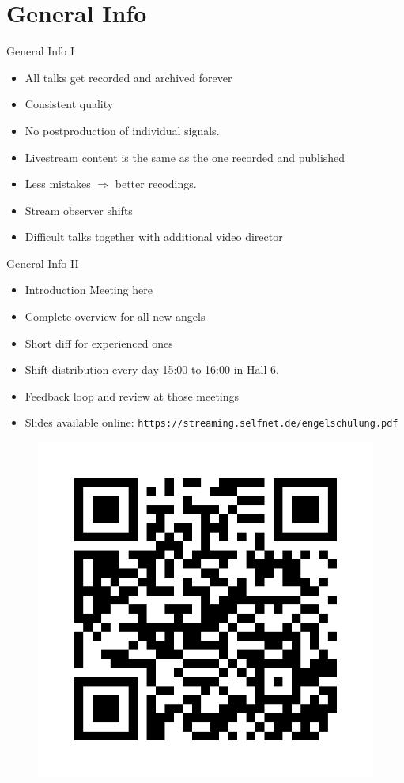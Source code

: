 \documentclass[aspectratio=169]{beamer}
\begin{document}
\section{General Info}
\begin{frame}{General Info I}
	\begin{itemize}
		\item All talks get recorded and archived forever
		\item Consistent quality
		\item No postproduction of individual signals.
		\item Livestream content is the same as the one recorded and published
		\item Less mistakes $\Rightarrow$ better recodings.
		\item Stream observer shifts
		\item Difficult talks together with additional video director
	\end{itemize}
\end{frame}


\begin{frame}{General Info II}
	\begin{itemize}
		\item Introduction Meeting here
		\item Complete overview for all new angels
		\item Short diff for experienced ones
		\item Shift distribution every day 15:00 to 16:00 in Hall 6.
		\item Feedback loop and review at those meetings
		\item Slides available online: \texttt{https://streaming.selfnet.de/engelschulung.pdf}
	\end{itemize}
	\begin{figure} 
		\centering
		\includegraphics[height=0.4\textheight]{qrcode.png}
		\label{fig:qr1}
	\end{figure}
\end{frame}
\end{document}
